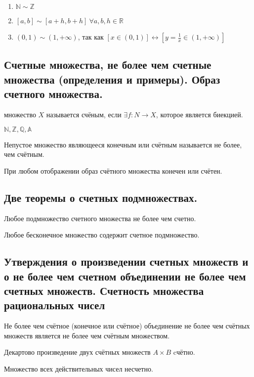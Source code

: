 \documentclass{article}
\begin{document}
\begin{enumerate}
	\item $\mathbb{N} \sim \mathbb{Z}$
	\item $[a, b] \sim [a + h,b + h] \ \forall a, b, h \in \mathbb{R}$
	\item $(0, 1) \sim (1, +\infty)$, так как $[x \in (0, 1)] \leftrightarrow [ y = \displaystyle\frac{1}{x} \in (1, +\infty)]$
\end{enumerate}

\subsection{Счетные множества, не более чем счетные множества (определения и примеры). Образ счетного множества.}
 множество $X$ называется счёным, если $\exists f: N \to X$, которое является биекцией.

 $\mathbb{N}, \mathbb{Z}, \mathbb{Q}, \mathbb{A}$

 Непустое множество являющееся конечным или счётным называется не более, чем счётным. 

 При любом отображении образ счётного множества конечен или счётен.

\subsection{Две теоремы о счетных подмножествах.}

 Любое подмножество счетного множества не более чем счетно.

 Любое бесконечное множество содержит счетное подмножество.


\subsection{Утверждения о произведении счетных множеств и о не более чем счетном объединении не более чем счетных множеств. Счетность множества рациональных чисел}

 Не более чем счётное (конечное или счётное) объединение не более чем счётных множеств является не более чем счётным множеством.

 Декартово произведение двух счётных множеств $A \times B$ cчётно.

 Множество всех действительных чисел несчетно. 
\end{document}

